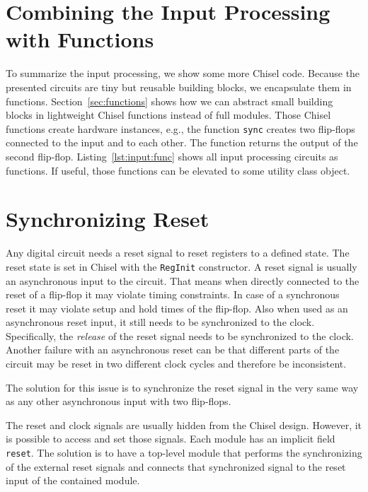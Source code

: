 \documentclass[%
    10pt,
    headinclude, footexclude,
    openright, %
    notitlepage,
    cleardoubleempty,
    headsepline,
    pointlessnumbers,
    bibtotoc, idxtotoc,
    ]{scrbook}
\newcommand{\code}[1]{{\small{\texttt{#1}}}}
\begin{document}

\section{Combining the Input Processing with Functions}

To summarize the input processing, we show some more Chisel code.
Because the presented circuits are tiny but reusable building blocks, we encapsulate
them in functions. Section~\ref{sec:functions} shows how we can abstract
small building blocks in lightweight Chisel functions instead of full modules.
Those Chisel functions create hardware instances, e.g., the function
\code{sync} creates two flip-flops connected to the input and to each other.
The function returns the output of the second flip-flop.
Listing~\ref{lst:input:func} shows all input processing circuits as functions.
If useful, those functions can be elevated to some utility class object.


\section{Synchronizing Reset}

Any digital circuit needs a reset signal to reset registers to a defined state. The reset state is
set in Chisel with the \code{RegInit} constructor. A reset signal is usually an asynchronous
input to the circuit. That means when directly connected to the reset of a flip-flop it may
violate timing constraints. In case of a synchronous reset it may violate setup and hold times
of the flip-flop. Also when used as an asynchronous reset input, it still needs to be synchronized
to the clock. Specifically, the \emph{release} of the reset signal needs to be synchronized to the clock.
Another failure with an asynchronous reset can be that different parts of the circuit may be
reset in two different clock cycles and therefore be inconsistent.

The solution for this issue is to synchronize the reset signal in the very same way as
any other asynchronous input with two flip-flops.

The reset and clock signals are usually hidden from the Chisel design.
However, it is possible to access and set those signals. Each module has an implicit field
\code{reset}. The solution is to have a top-level module that performs the synchronizing
of the external reset signals and connects that synchronized signal to the reset input
of the contained module.
\end{document}
